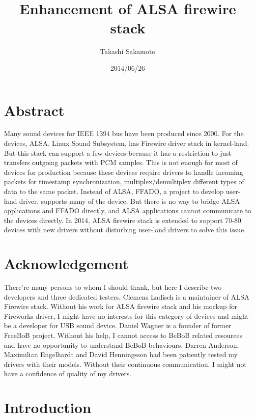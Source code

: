 \documentclass[onecolumn]{article}
\begin{document}
\title{Enhancement of ALSA firewire stack}
\author{Takashi Sakamoto}
\date{2014/06/26}
\maketitle{}

\section{Abstract}

Many sound devices for IEEE 1394 bus have been produced since 2000. For the devices, ALSA, Linux Sound Subsystem, has Firewire driver stack in kernel-land. But this stack can support a few devices because it has a restriction to just transfers outgoing packets with PCM samples. This is not enough for most of devices for production because these devices require drivers to handle incoming packets for timestamp synchronization, multiplex/demultiplex different types of data to the same packet. Instead of ALSA, FFADO, a project to develop user-land driver, supports many of the device. But there is no way to bridge ALSA applications and FFADO directly, and ALSA applications cannot communicate to the devices directly. In 2014, ALSA firewire stack is extended to support 70-80 devices with new drivers without disturbing user-land drivers to solve this issue.


\section{Acknowledgement}

There're many persons to whom I should thank, but here I describe two developers and three dedicated testers. Clemens Ladisch is a maintainer of ALSA Firewire stack. Without his work for ALSA firewire stack and his mockup for Fireworks driver, I might have no interests for this category of devices and might be a developer for USB sound device. Daniel Wagner is a founder of former FreeBoB project. Without his help, I cannot access to BeBoB related resources and have no opportunity to understand BeBoB behaviours. Darren Anderson, Maximilian Engelhardt and David Henningsson had been patiently tested my drivers with their models. Without their continuous communication, I might not have a confidence of quality of my drivers.


\section{Introduction}
\end{document}
